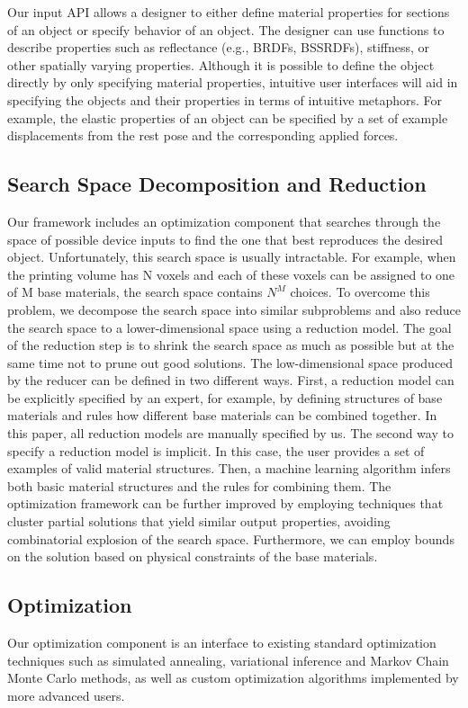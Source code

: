 \documentclass[annual]{acmsiggraph}
\begin{document}
Our input API allows a designer to either
define material properties for sections of an object
or specify behavior of an object.
The designer
can use functions to describe properties such as reflectance (e.g., BRDFs, BSSRDFs), 
stiffness, or other spatially varying properties. 
Although it is possible to define the object directly by only specifying material
properties, intuitive user
interfaces will aid in specifying the objects and their properties
in terms of intuitive metaphors.
For example, the elastic properties of an object can be specified by a set of
example displacements from the rest pose and the corresponding applied forces.
\subsection{Search Space Decomposition and Reduction}
Our framework includes an optimization component that
searches through the space of possible device inputs
to find the one that best reproduces
the desired object. Unfortunately, this search space
is usually intractable. For example, when the printing
volume has N voxels and each of these voxels can be
assigned to one of M base materials, the search space
contains $N^M$ choices. To overcome this problem, we decompose the search
space into similar subproblems and also reduce
the search space to a lower-dimensional space using
a reduction model. The goal of the reduction step is to
shrink the search space as much as possible but at the
same time not to prune out good solutions. The low-dimensional space produced by the
reducer can be defined in two different ways. First, a reduction model can be explicitly specified by an expert, for
example, by defining structures of base materials and rules how different base materials can be combined together.
In this paper, all reduction models are manually specified by us.
The second way to specify a reduction model is implicit. In this case, the user provides a set of examples of
valid material structures. Then, a machine learning algorithm infers both basic material structures and the rules
for combining them. The optimization framework can be further improved by employing techniques that cluster
partial solutions that yield similar output properties, avoiding combinatorial explosion of the search space.
Furthermore, we can employ bounds on the solution based on physical constraints of the base materials.
\subsection{Optimization}
Our optimization component is an interface to
existing standard optimization techniques
such as simulated annealing, variational inference and
Markov Chain Monte Carlo methods,
as well as custom optimization algorithms implemented
by more advanced users.
\end{document}
